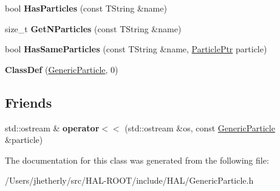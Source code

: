 \begin{DoxyCompactItemize}
\item 
\hypertarget{class_h_a_l_1_1_generic_particle_ac0f562c1225127b099ef7df56ae3177d}{bool {\bfseries Has\+Particles} (const T\+String \&name)}\label{class_h_a_l_1_1_generic_particle_ac0f562c1225127b099ef7df56ae3177d}

\item 
\hypertarget{class_h_a_l_1_1_generic_particle_afddc36ec1e6dad1c155449386ea716b6}{size\+\_\+t {\bfseries Get\+N\+Particles} (const T\+String \&name)}\label{class_h_a_l_1_1_generic_particle_afddc36ec1e6dad1c155449386ea716b6}

\item 
\hypertarget{class_h_a_l_1_1_generic_particle_a968d9fb1e1800b48182055ec8df38e39}{bool {\bfseries Has\+Same\+Particles} (const T\+String \&name, \hyperlink{class_h_a_l_1_1_generic_particle}{Particle\+Ptr} particle)}\label{class_h_a_l_1_1_generic_particle_a968d9fb1e1800b48182055ec8df38e39}

\item 
\hypertarget{class_h_a_l_1_1_generic_particle_ad23fc850d01f55da3b3c27366504289e}{{\bfseries Class\+Def} (\hyperlink{class_h_a_l_1_1_generic_particle}{Generic\+Particle}, 0)}\label{class_h_a_l_1_1_generic_particle_ad23fc850d01f55da3b3c27366504289e}

\end{DoxyCompactItemize}
\subsection*{Friends}
\begin{DoxyCompactItemize}
\item 
\hypertarget{class_h_a_l_1_1_generic_particle_a21417ca06cb919c843aa8c97cd734c1e}{std\+::ostream \& {\bfseries operator$<$$<$} (std\+::ostream \&os, const \hyperlink{class_h_a_l_1_1_generic_particle}{Generic\+Particle} \&particle)}\label{class_h_a_l_1_1_generic_particle_a21417ca06cb919c843aa8c97cd734c1e}

\end{DoxyCompactItemize}


The documentation for this class was generated from the following file\+:\begin{DoxyCompactItemize}
\item 
/\+Users/jhetherly/src/\+H\+A\+L-\/\+R\+O\+O\+T/include/\+H\+A\+L/Generic\+Particle.\+h\end{DoxyCompactItemize}
